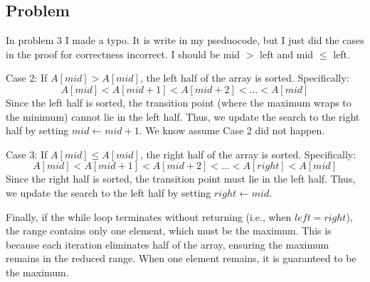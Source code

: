 \documentclass[12pt, letterpaper]{article}
\theoremstyle{definition}
\newcounter{problem}
\newcommand{\q}{
    \newpage %
    \stepcounter{problem} %
    \subsection*{Problem \arabic{problem}} %
}
\begin{document}
\pagestyle{fancy}
\fancyhf{}
\fancyhead[ROE]{\thepage}

\q
In problem 3 I made a typo. It is write in my pseduocode, but I just did the cases in the proof for correctness incorrect. I should be mid $>$ left and mid $\leq$ left.

Case 2: If $A[mid] > A[mid]$, the left half of the array is sorted. Specifically:
        \[
        A[mid] < A[mid + 1] < A[mid + 2] < \dots < A[mid]
        \]
        Since the left half is sorted, the transition point (where the maximum wraps to the minimum) cannot lie in the left half. Thus, we update the search to the right half by setting $mid \gets mid + 1$. We know assume Case 2 did not happen.

        Case 3: If $A[mid] \leq A[mid]$, the right half of the array is sorted. Specifically:
        \[
        A[mid] < A[mid + 1] < A[mid + 2] < \dots < A[right] < A[mid]
        \]
        Since the right half is sorted, the transition point must lie in the left half. Thus, we update the search to the left half by setting $right \gets mid$.

        Finally, if the while loop terminates without returning (i.e., when $left = right$), the range contains only one element, which must be the maximum. This is because each iteration eliminates half of the array, ensuring the maximum remains in the reduced range. When one element remains, it is guaranteed to be the maximum.
\end{document}
